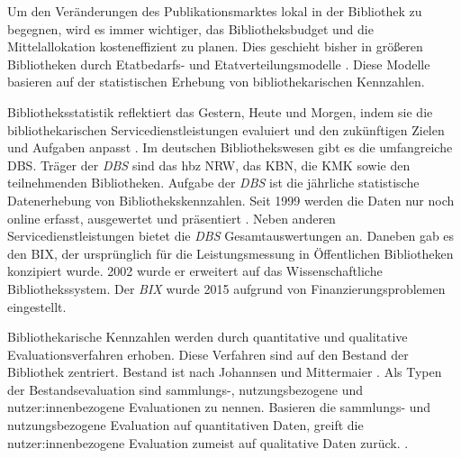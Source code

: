 Um den Veränderungen des Publikationsmarktes lokal in der Bibliothek zu begegnen, wird es immer wichtiger, das Bibliotheksbudget und die Mittelallokation kosteneffizient zu planen. 
Dies geschieht bisher in größeren Bibliotheken durch Etatbedarfs- und Etatverteilungsmodelle \cite[vgl.][172 ff.]{moravetz-kuhlmann_monika_erwerbungspolitik_2015}.
Diese Modelle basieren auf der statistischen Erhebung von bibliothekarischen Kennzahlen.

Bibliotheksstatistik reflektiert das Gestern, Heute und Morgen, indem 
sie die bibliothekarischen Servicedienstleistungen evaluiert und den zukünftigen Zielen und Aufgaben anpasst \cites[vgl.][2 f.]{jilovsky_cathie_library_2004}[vgl.][462]{laitinen_markku_library_2013}.
Im deutschen Bibliothekswesen gibt es die umfangreiche \acrfull{DBS}. 
Träger der \textit{\acrshort{DBS}} sind das \acrfull{hbz NRW},  das \acrfull{KBN}, die \acrfull{KMK} sowie den teilnehmenden Bibliotheken.
Aufgabe der \textit{\acrshort{DBS}} ist die jährliche statistische Datenerhebung von Bibliothekskennzahlen. 
Seit 1999 werden die Daten nur noch online erfasst, ausgewertet und präsentiert \cite[vgl.][2]{schmidt_deutsche_2008}.
Neben anderen Servicedienstleistungen bietet die \textit{\acrshort{DBS}} Gesamtauswertungen an.
Daneben gab es den \acrfull{BIX}, der ursprünglich für die Leistungsmessung in Öffentlichen Bibliotheken konzipiert wurde. 
2002 wurde er erweitert auf das Wissenschaftliche Bibliothekssystem. Der \textit{\acrshort{BIX}} wurde 2015 aufgrund von Finanzierungsproblemen eingestellt. 

Bibliothekarische Kennzahlen werden durch quantitative und qualitative Evaluationsverfahren erhoben. Diese Verfahren
sind auf den Bestand der Bibliothek zentriert. 
Bestand ist nach Johannsen und Mittermaier
 \cite[252]{johannsen_jochen_bestands-_2015}.
Als Typen der Bestandsevaluation sind sammlungs-, nutzungsbezogene und nutzer:innenbezogene Evaluationen zu nennen.\cite[vgl.][302]{johnson_peggy_fundamentals_2014}
Basieren die sammlungs- und nutzungsbezogene Evaluation auf quantitativen Daten, greift die nutzer:innenbezogene Evaluation zumeist auf qualitative Daten zurück. 
\cite[vgl.][461 ff.]{blake_data_2004}.

